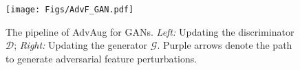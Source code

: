 \documentclass{article}
\newcommand{\Def}[0]{\mathrel{\mathop:}=}
\newcommand{\TL}[1]{\textcolor{Tianlong_color}{TL:#1}}
\begin{document}

\begin{figure}[t] 
\vspace{-6mm}
\centering
\texttt{[image: Figs/AdvF\_GAN.pdf]}
\vspace{-4mm}
\caption{\small The pipeline of AdvAug for GANs. \textit{Left:} Updating the discriminator $\mathcal{D}$; \textit{Right:} Updating the generator $\mathcal{G}$. Purple arrows denote the path to generate adversarial feature perturbations.}
\vspace{-5mm}
\label{fig:AdvAug_gan}
\end{figure}

\vspace{-0.5em}
\end{document}
